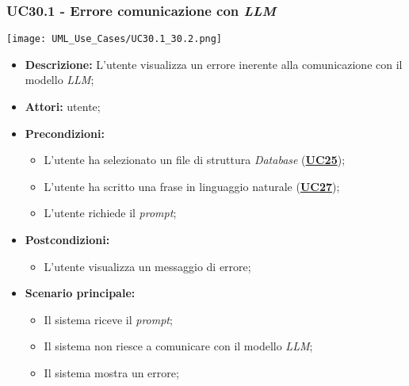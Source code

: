 \subsubsection{UC30.1 - Errore comunicazione con \textit{LLM}}
\label{sec:UC30.1}
\texttt{[image: UML\_Use\_Cases/UC30.1\_30.2.png]}
\begin{itemize}
	\item \textbf{Descrizione:} L’utente visualizza un errore inerente alla comunicazione con il modello \textit{LLM};
	\item \textbf{Attori:} utente;
	\item \textbf{Precondizioni:} 
	\begin{itemize}
		\item L’utente ha selezionato un file di struttura \textit{Database} (\hyperref[sec:UC25]{\textbf{UC25}});
		\item L’utente ha scritto una frase in linguaggio naturale (\hyperref[sec:UC27]{\textbf{UC27}});
		\item L’utente richiede il \textit{prompt};
	\end{itemize}
	\item \textbf{Postcondizioni:} 
	\begin{itemize}
		\item L’utente visualizza un messaggio di errore;
	\end{itemize}
	\item \textbf{Scenario principale:} 
	\begin{itemize}
		\item Il sistema riceve il \textit{prompt};
		\item Il sistema non riesce a comunicare con il modello \textit{LLM};
		\item Il sistema mostra un errore;
	\end{itemize}
\end{itemize}

